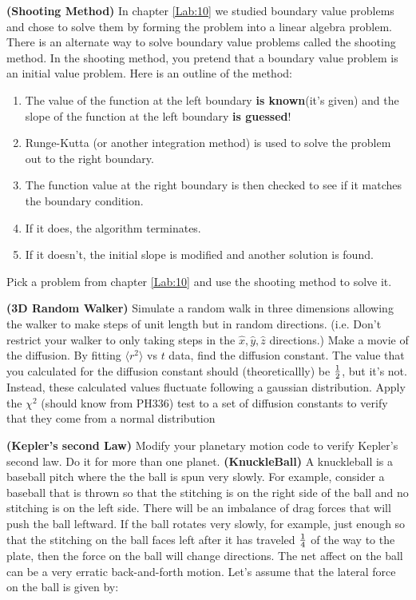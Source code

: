 \begin{enumerate}
  \prob \textbf{(Shooting Method)} In chapter \ref{Lab:10} we studied
  boundary value problems and chose to solve them by forming the
  problem into a linear algebra problem.  There is an alternate way to
  solve boundary value problems called the shooting method. In the
  shooting method, you pretend that a boundary value problem is an
  initial value problem. Here is
  an outline of the method:
\begin{enumerate}
\item  The value of the function at the left
  boundary \textbf{is known}(it's given) and the slope of the function at the left
  boundary \textbf{is guessed}!
\item   Runge-Kutta (or another integration method) is used to solve the
  problem out to the right boundary.
\item   The function value at the right boundary is then
  checked to see if it matches the boundary condition.
\item   If it does, the algorithm terminates.
\item  If it doesn't, the initial slope is modified and another
  solution is found. 
\end{enumerate}
 Pick a problem from chapter \ref{Lab:10} and use the
  shooting method to solve it.

\prob \textbf{(3D Random Walker)} Simulate a random walk in three
dimensions allowing the walker to make steps of unit length but in
random directions.  (i.e. Don't restrict your walker to only taking
steps in the $\hat{x},\hat{y},\hat{z}$ directions.)  Make a movie of
the diffusion.  By fitting $\langle r^2 \rangle$ vs $ t$ data, find
the diffusion constant.  The value that you calculated for the
diffusion constant should (theoreticallly) be ${1\over 2}$, but it's
not.  Instead, these calculated values fluctuate following a gaussian
distribution.  Apply the $\chi^2$ (should know from PH336) test to a
set of diffusion constants to verify that they come from a normal
distribution

\prob \textbf{(Kepler's second Law)}  Modify your planetary motion
code to verify Kepler's second law.  Do it for more than one planet. 
\prob \textbf{(KnuckleBall)} A knuckleball is a baseball pitch where the
the ball is spun very slowly.  For example, consider a baseball that
is thrown so that the stitching is on the right side of the ball and
no stitching is on the left side.  There will be an imbalance of drag
forces that will push the ball leftward. If the ball rotates very
slowly, for example, just enough so that the stitching on the ball
faces left after it has traveled ${1\over 4}$ of the way to the plate,
then the force on the ball will change directions.  The net affect on
the ball can be a very erratic back-and-forth motion.   Let's assume
that the lateral force on the ball is given by:


\end{enumerate}
